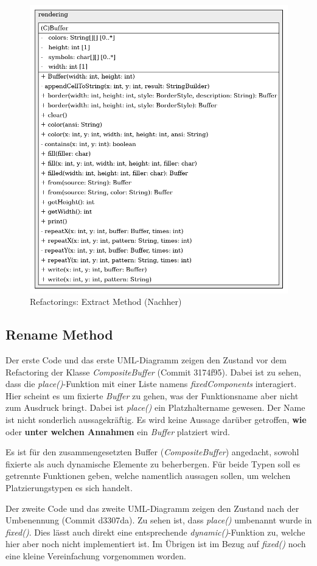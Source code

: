 \vspace{0.5cm}
\begin{figure}[H]
    \centering
    \includegraphics[width=0.6\linewidth]{Bilder/Visualisierung/BufferAfterRestructure_structure.png}
    \caption{Refactorings: Extract Method (Nachher)}
\end{figure}

\subsection*{Rename Method}
Der erste Code und das erste UML-Diagramm zeigen den Zustand vor
dem Refactoring der Klasse \textit{CompositeBuffer} (Commit 3174f95).
Dabei ist zu sehen, dass die \textit{place()}-Funktion
mit einer Liste namens \textit{fixedComponents} interagiert. Hier
scheint es um fixierte \textit{Buffer} zu gehen, was der Funktionsname
aber nicht zum Ausdruck bringt. Dabei ist \textit{place()} ein
Platzhaltername gewesen. Der Name ist nicht sonderlich aussagekräftig.
Es wird keine Aussage darüber getroffen, \textbf{wie} oder \textbf{unter
welchen Annahmen} ein \textit{Buffer} platziert wird.

Es ist für den zusammengesetzten Buffer (\textit{CompositeBuffer})
angedacht, sowohl fixierte als auch dynamische Elemente zu beherbergen.
Für beide Typen soll es getrennte Funktionen geben, welche namentlich
aussagen sollen, um welchen Platzierungstypen es sich handelt.

Der zweite Code und das zweite UML-Diagramm zeigen den Zustand nach
der Umbenennung (Commit d3307da). Zu sehen ist, dass \textit{place()}
umbenannt wurde in \textit{fixed()}. Dies lässt auch direkt eine
entsprechende \textit{dynamic()}-Funktion zu, welche hier aber noch
nicht implementiert ist. Im Übrigen ist im Bezug auf \textit{fixed()}
noch eine kleine Vereinfachung vorgenommen worden.

